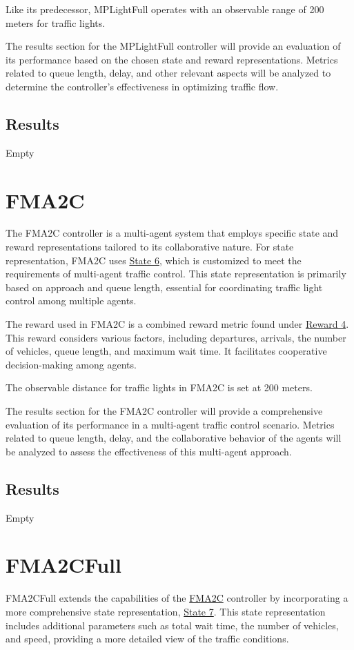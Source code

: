 Like its predecessor, MPLightFull operates with an observable range of 200 meters for traffic lights.

The results section for the MPLightFull controller will provide an evaluation of its performance based on the chosen state and reward representations. Metrics related to queue length, delay, and other relevant aspects will be analyzed to determine the controller's effectiveness in optimizing traffic flow.

\subsection{Results}
Empty

\section{FMA2C} \label{sec:exp-fma2c}
The FMA2C controller is a multi-agent system that employs specific state and reward representations tailored to its collaborative nature. For state representation, FMA2C uses \hyperref[subsec:state-6]{State 6}, which is customized to meet the requirements of multi-agent traffic control. This state representation is primarily based on approach and queue length, essential for coordinating traffic light control among multiple agents.

The reward used in FMA2C is a combined reward metric found under \hyperref[subsec:reward-4]{Reward 4}. This reward considers various factors, including departures, arrivals, the number of vehicles, queue length, and maximum wait time. It facilitates cooperative decision-making among agents.

The observable distance for traffic lights in FMA2C is set at 200 meters.

The results section for the FMA2C controller will provide a comprehensive evaluation of its performance in a multi-agent traffic control scenario. Metrics related to queue length, delay, and the collaborative behavior of the agents will be analyzed to assess the effectiveness of this multi-agent approach.

\subsection{Results}
Empty

\section{FMA2CFull}
FMA2CFull extends the capabilities of the \hyperref[sec:exp-fma2c]{FMA2C} controller by incorporating a more comprehensive state representation, \hyperref[subsec:state-7]{State 7}. This state representation includes additional parameters such as total wait time, the number of vehicles, and speed, providing a more detailed view of the traffic conditions.

